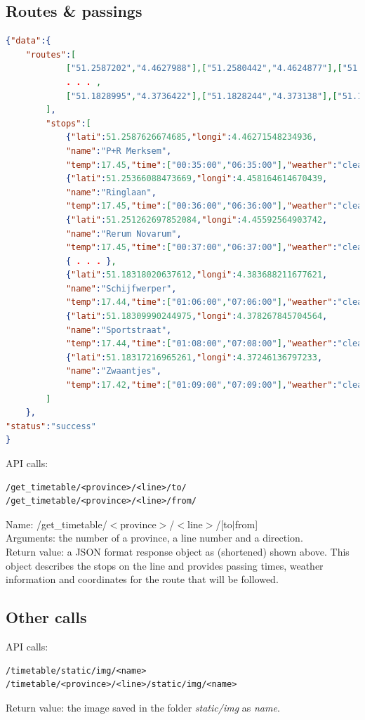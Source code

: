 \documentclass[12pt]{article}
\begin{document}
\subsection{Routes \& passings}
\begin{lstlisting}[language=json]
{"data":{
	"routes":[
			["51.2587202","4.4627988"],["51.2580442","4.4624877"],["51.2560165","4.4605994"],
			. . . ,
			["51.1828995","4.3736422"],["51.1828244","4.373138"],["51.1827684","4.3728861"]
		],
		"stops":[
			{"lati":51.2587626674685,"longi":4.46271548234936,
			"name":"P+R Merksem",
			"temp":17.45,"time":["00:35:00","06:35:00"],"weather":"clear sky"},
			{"lati":51.25366088473669,"longi":4.458164614670439,
			"name":"Ringlaan",
			"temp":17.45,"time":["00:36:00","06:36:00"],"weather":"clear sky"},
			{"lati":51.251262697852084,"longi":4.45592564903742,
			"name":"Rerum Novarum",
			"temp":17.45,"time":["00:37:00","06:37:00"],"weather":"clear sky"},
			{ . . . },
			{"lati":51.18318020637612,"longi":4.383688211677621,
			"name":"Schijfwerper",
			"temp":17.44,"time":["01:06:00","07:06:00"],"weather":"clear sky"},
			{"lati":51.18309990244975,"longi":4.378267845704564,
			"name":"Sportstraat",
			"temp":17.44,"time":["01:08:00","07:08:00"],"weather":"clear sky"},
			{"lati":51.18317216965261,"longi":4.37246136797233,
			"name":"Zwaantjes",
			"temp":17.42,"time":["01:09:00","07:09:00"],"weather":"clear sky"}
		]
	},
"status":"success"
}
\end{lstlisting}
API calls:
\begin{lstlisting}[style=DOS]
/get_timetable/<province>/<line>/to/
/get_timetable/<province>/<line>/from/
\end{lstlisting}
Name: /get\_timetable/$<$province$>$/$<$line$>$/[to$|$from]\\
Arguments: the number of a province, a line number and a direction.\\
Return value: a JSON format response object as (shortened) shown above. This object describes the stops on the line and provides passing times, weather information and coordinates for the route that will be followed. 

\subsection{Other calls}
API calls:
\begin{lstlisting}[style=DOS]
/timetable/static/img/<name>
/timetable/<province>/<line>/static/img/<name>
\end{lstlisting}
Return value: the image saved in the folder \emph{static/img} as \emph{name}.
\end{document}
